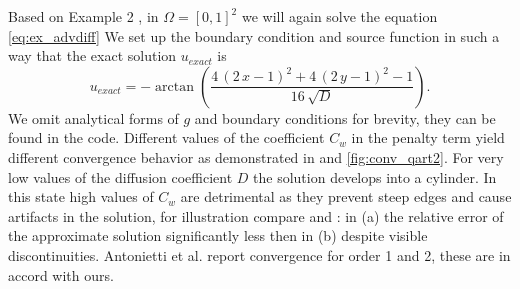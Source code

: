 \begin{example}
\label{ex:quart2}
Based on Example 2 \cite{Antonietti2013},
in $\Omega = [0, 1 ]^2$ we will again solve the equation \eqref{eq:ex_advdiff}
We set up the boundary condition and source function in such a way that the exact
solution $u_{exact}$ is
\begin{equation}
	u_{exact} =  -\arctan\left(\frac{4 \, {\left(2 \, x - 1\right)}^{2} + 4 \, {\left(2
	\, y - 1\right)}^{2} -
	1}{16 \, \sqrt{\mathit{D}}}\right).
\end{equation}
We omit analytical forms of $g$ and boundary conditions for brevity, they can be found in
the code. Different values of the coefficient $C_w$ in the penalty term yield different
convergence behavior as demonstrated in  and 
\ref{fig:conv_qart2}. For very low values of the diffusion coefficient $D$ the
solution develops into a cylinder. In this state high values of $C_w$ are detrimental as
they prevent steep edges and cause artifacts in the solution, for illustration compare
 and : in (a) the relative error of
the approximate solution significantly less then in (b) despite visible discontinuities.
Antonietti et al. \cite{Antonietti2013} report convergence for order 1 and 2, these are
in accord with ours.

\end{example}

